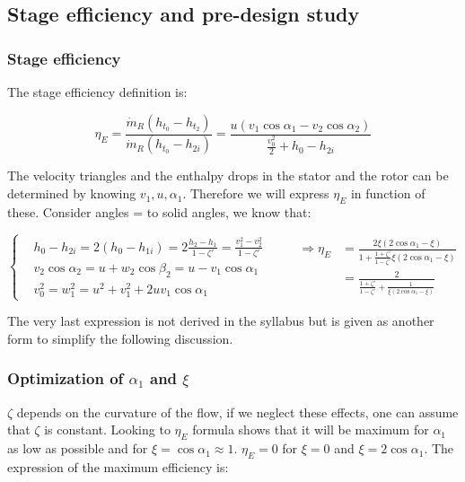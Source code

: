 \subsection{Stage efficiency and pre-design study}
\subsubsection{Stage efficiency}
The stage efficiency definition is: 

\begin{equation}
\eta _E = \frac{\dot{m}_R (h_{t_0}-h_{t_2})}{\dot{m}_R (h_{t_0} - h_{2i})} = \frac{u(v_1 \cos \alpha _1 - v_2 \cos \alpha _2)}{\frac{v_0^2}{2} + h_0 - h_{2i}}
\end{equation}

The velocity triangles and the enthalpy drops in the stator and the rotor can be determined by knowing $v_1, u, \alpha _1$. Therefore we will express $\eta _E$ in function of these. Consider angles = to solid angles, we know that:  

\begin{equation}
\left\{
\begin{aligned}
&h_0  - h_{2i} = 2 (h_0 - h_{1i}) = 2\frac{h_2 - h_1}{1 - \zeta '} = \frac{v_1^2 - v_2^2}{1- \zeta '}\\
&v_2 \cos \alpha _2 = u + w_2 \cos \beta _2 = u - v_1 \cos \alpha _1\\
&v_0 ^2 = w_1 ^2 = u^2 + v_1 ^2 + 2uv_1 \cos \alpha _1 
\end{aligned}
\right.
\qquad  
\begin{aligned}
\Rightarrow \eta _E &= \frac{2\xi (2\cos \alpha _1 - \xi)}{1 + \frac{1 + \zeta '}{1 - \zeta '}\xi (2\cos \alpha _1 - \xi)}\\
&= \frac{2}{\frac{1 + \zeta '}{1 - \zeta '} + \frac{1}{\xi (2\cos \alpha _1 - \xi)}}
\end{aligned}
\end{equation}

The very last expression is not derived in the syllabus but is given as another form to simplify the following discussion. 

\subsubsection{Optimization of $\alpha _1$ and $\xi$}
$\zeta$ depends on the curvature of the flow, if we neglect these effects, one can assume that $\zeta$ is constant. Looking to $\eta _E$ formula shows that it will be maximum for $\alpha _1 $ as low as possible and for $\xi = \cos \alpha _1 \approx 1$. $\eta _E = 0$ for $\xi = 0$ and $\xi = 2\cos \alpha _1$. The expression of the maximum efficiency is: 

